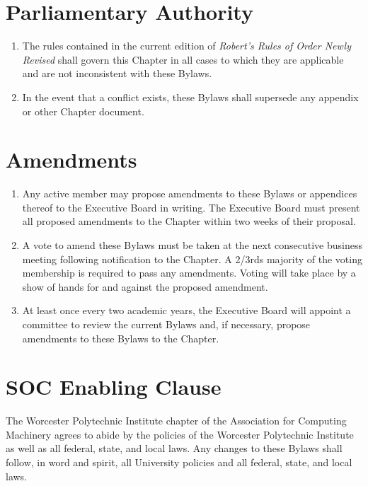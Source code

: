 \documentclass[12pt, letterpaper, oneside]{book}
\begin{document}
\chapter{Parliamentary Authority}
\begin{enumerate}
    \item The rules contained in the current edition of \emph{Robert's Rules of
        Order Newly Revised} shall govern this Chapter in all cases to which
        they are applicable and are not inconsistent with these Bylaws.
    \item In the event that a conflict exists, these Bylaws shall supersede any
        appendix or other Chapter document.
\end{enumerate}

\chapter{Amendments}
\begin{enumerate}
    \item Any active member may propose amendments to these Bylaws or appendices
        thereof to the Executive Board in writing. The Executive Board must
        present all proposed amendments to the Chapter within two weeks of their
        proposal.
    \item A vote to amend these Bylaws must be taken at the next consecutive
        business meeting following notification to the Chapter.
        \subitem A 2/3rds majority of the voting membership is required to pass
        any amendments. Voting will take place by a show of hands for and
        against the proposed amendment.
    \item At least once every two academic years, the Executive Board will
        appoint a committee to review the current Bylaws and, if necessary,
        propose amendments to these Bylaws to the Chapter.
\end{enumerate}

\chapter{SOC Enabling Clause}
The Worcester Polytechnic Institute chapter of the Association for Computing
Machinery agrees to abide by the policies of the Worcester Polytechnic Institute
as well as all federal, state, and local laws. Any changes to these Bylaws shall
follow, in word and spirit, all University policies and all federal, state, and
local laws.
\end{document}
